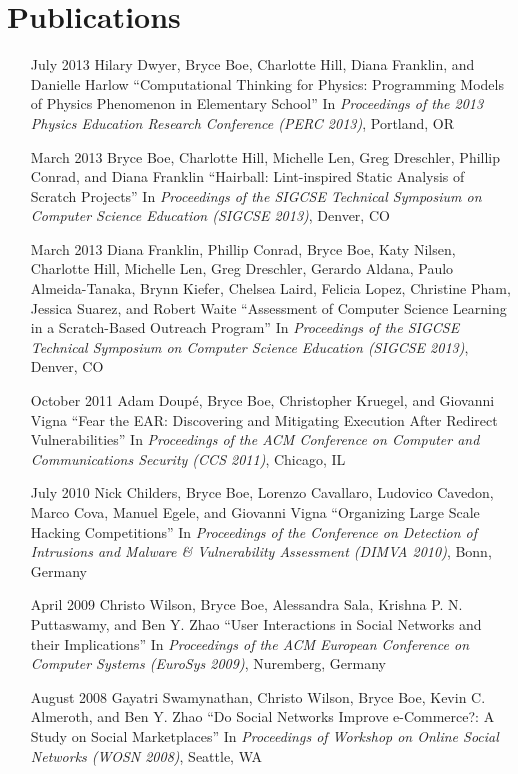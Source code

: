 \documentclass[10pt,letterpaper,oneside,twocolumn]{article}
\begin{document}
\section{Publications}
\begin{itemize}
  \item [July 2013] Hilary Dwyer, Bryce Boe, Charlotte Hill, Diana Franklin,
    and Danielle Harlow ``Computational Thinking for Physics: Programming
    Models of Physics Phenomenon in Elementary School'' In \emph{Proceedings of
      the 2013 Physics Education Research Conference (PERC 2013)}, Portland, OR
  \item [March 2013] Bryce Boe, Charlotte Hill, Michelle Len, Greg Dreschler,
    Phillip Conrad, and Diana Franklin ``Hairball: Lint-inspired Static
    Analysis of Scratch Projects'' In \emph{Proceedings of the  SIGCSE
      Technical Symposium on Computer Science Education (SIGCSE 2013)}, Denver,
    CO
  \item [March 2013] Diana Franklin, Phillip Conrad, Bryce Boe, Katy Nilsen,
    Charlotte Hill, Michelle Len, Greg Dreschler, Gerardo Aldana, Paulo
    Almeida-Tanaka, Brynn Kiefer, Chelsea Laird, Felicia Lopez, Christine Pham,
    Jessica Suarez, and Robert Waite ``Assessment of Computer Science Learning
    in a Scratch-Based Outreach Program'' In \emph{Proceedings of the 
      SIGCSE Technical Symposium on Computer Science Education (SIGCSE 2013)},
    Denver, CO
  \item [October 2011] Adam Doup\'e, Bryce Boe, Christopher Kruegel, and
    Giovanni Vigna ``Fear the EAR: Discovering and Mitigating Execution After
    Redirect Vulnerabilities'' In \emph{Proceedings of the  ACM
      Conference on Computer and Communications Security (CCS 2011)}, Chicago,
    IL
  \item [July 2010] Nick Childers, Bryce Boe, Lorenzo Cavallaro, Ludovico
    Cavedon, Marco Cova, Manuel Egele, and Giovanni Vigna ``Organizing Large
    Scale Hacking Competitions'' In \emph{Proceedings of the  Conference
      on Detection of Intrusions and Malware \& Vulnerability Assessment (DIMVA
      2010)}, Bonn, Germany
  \item [April 2009] Christo Wilson, Bryce Boe, Alessandra Sala, Krishna
    P. N. Puttaswamy, and Ben Y. Zhao ``User Interactions in Social Networks
    and their Implications'' In \emph{Proceedings of the  ACM European
      Conference on Computer Systems (EuroSys 2009)}, Nuremberg, Germany
  \item [August 2008] Gayatri Swamynathan, Christo Wilson, Bryce Boe, Kevin
    C. Almeroth, and Ben Y. Zhao ``Do Social Networks Improve e-Commerce?: A
    Study on Social Marketplaces'' In \emph{Proceedings of  Workshop on
      Online Social Networks (WOSN 2008)}, Seattle, WA
\end{itemize}
\end{document}
